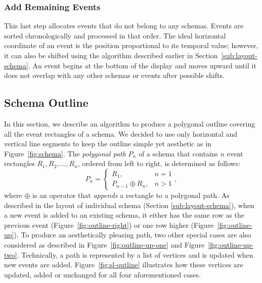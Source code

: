 \subsubsection{Add Remaining Events}
This last step allocates events that do not belong to any schemas. Events are sorted chronologically and processed in that order. The ideal horizontal coordinate of an event is the position proportional to its temporal value; however, it can also be shifted using the algorithm described earlier in Section~\ref{sub:layout-schema}. An event begins at the bottom of the display and moves upward until it does not overlap with any other schemas or events after possible shifts. 

\subsection{Schema Outline}
In this section, we describe an algorithm to produce a polygonal outline covering all the event rectangles of a schema. We decided to use only horizontal and vertical line segments to keep the outline simple yet aesthetic as in Figure~\ref{fig:schema}. The \emph{polygonal path} $P_n$ of a schema that contains $n$ event rectangles $R_1, R_2, ..., R_n$, ordered from left to right, is determined as follows:
\[
P_n=
\begin{cases}
R_1, & n=1 \\
P_{n-1} \oplus R_n, & n > 1
\end{cases},
\]
where $\oplus$ is an operator that \emph{appends} a rectangle to a polygonal path. As described in the layout of individual schema (Section \ref{sub:layout-schema}), when a new event is added to an existing schema, it either has the same row as the previous event (Figure~\ref{fig:outline-right}) or one row higher (Figure~\ref{fig:outline-up}). To produce an aesthetically pleasing path, two other special cases are also considered as described in Figure~\ref{fig:outline-up-one} and Figure~\ref{fig:outline-up-two}. Technically, a path is represented by a list of vertices and is updated when new events are added. Figure~\ref{fig:sl-outline} illustrates how these vertices are updated, added or unchanged for all four aforementioned cases.

